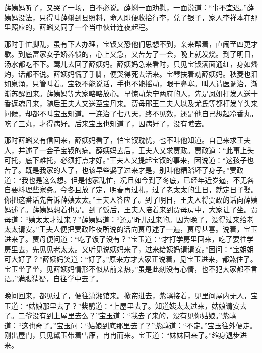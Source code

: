 \begin{parag}
    薛姨妈听了，又哭了一场，自不必说。薛蝌一面劝慰，一面说道：“事不宜迟。”薛姨妈没法，只得叫薛蝌到县照料，命人即便收拾行李，兑了银子，家人李祥本在那里照应的，薛蝌又同了一个当中伙计连夜起程。
\end{parag}


\begin{parag}
    那时手忙脚乱，虽有下人办理，宝钗又恐他们思想不到，亲来帮着，直闹至四更才歇。到底富家女子娇养惯的，心上又急，又苦劳了一会，晚上就发烧。到了明日，汤水都吃不下。莺儿去回了薛姨妈。薛姨妈急来看时，只见宝钗满面通红，身如燔灼，话都不说。薛姨妈慌了手脚，便哭得死去活来。宝琴扶着劝薛姨妈。秋菱也泪如泉涌，只管叫着。宝钗不能说话，手也不能摇动，眼干鼻塞。叫人请医调治，渐渐苏醒回来。薛姨妈等大家略略放心。早惊动荣宁两府的人，先是凤姐打发人送十香返魂丹来，随后王夫人又送至宝丹来。贾母邢王二夫人以及尤氏等都打发丫头来问候，却都不叫宝玉知道。一连治了七八天，终不见效，还是他自己想起冷香丸，吃了三丸，才得病好。后来宝玉也知道了，因病好了，没有瞧去。
\end{parag}


\begin{parag}
    那时薛蝌又有信回来，薛姨妈看了，怕宝钗耽忧，也不叫他知道。自己来求王夫人，并述了一会子宝钗的病。薛姨妈去后，王夫人又求贾政。贾政道：“此事上头可托，底下难托，必须打点才好。”王夫人又提起宝钗的事来，因说道：“这孩子也苦了。既是我家的人了，也该早些娶了过来才是，别叫他糟踏坏了身子。”贾政道：“我也是这么想。但是他家乱忙，况且如今到了冬底，已经年近岁逼，不无各自要料理些家务。今冬且放了定，明春再过礼，过了老太太的生日，就定日子娶。你把这番话先告诉薛姨太太。”王夫人答应了。到了明日，王夫人将贾政的话向薛姨妈述了。薛姨妈想着也是。到了饭后，王夫人陪着来到贾母房中，大家让了坐。贾母道：“姨太太才过来？”薛姨妈道：“还是昨儿过来的。因为晚了，没得过来给老太太请安。”王夫人便把贾政昨夜所说的话向贾母述了一遍，贾母甚喜。说着，宝玉进来了。贾母便问道：“吃了饭了没有？”宝玉道：“才打学房里回来，吃了要往学房里去，先见见老太太。又听见说姨妈来了，过来给姨妈请请安。”因问：“宝姐姐可大好了？”薛姨妈笑道：“好了。”原来方才大家正说着，见宝玉进来，都煞住了。宝玉坐了坐，见薛姨妈情形不似从前亲热，”虽是此刻没有心情，也不犯大家都不言语。”满腹猜疑，自往学中去了。
\end{parag}


\begin{parag}
    晚间回来，都见过了，便往潇湘馆来。掀帘进去，紫鹃接着，见里间屋内无人，宝玉道：“姑娘那里去了？”紫鹃道：“上屋里去了。知道姨太太过来，姑娘请安去了。二爷没有到上屋里去么？”宝玉道：“我去了来的，没有见你姑娘。”紫鹃道：“这也奇了。”宝玉问：“姑娘到底那里去了？”紫鹃道：“不定。”宝玉往外便走。刚出屋门，只见黛玉带着雪雁，冉冉而来。宝玉道：“妹妹回来了。”缩身退步进来。
\end{parag}


